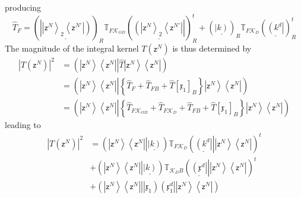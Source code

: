 \documentclass[aps,preprint]{revtex4}%
\begin{document}
producing
\begin{equation}
\hat{T}_{F}=\left(  \underline{\left\vert \left\vert \mathsf{z}^{N}%
\right\rangle _{2}\left\langle \mathsf{z}^{N\prime}\right\vert \right)
}\right)  _{R}\mathbb{T}_{F\mathcal{K}_{OD}}\left(  \underline{\left(
\left\vert \mathsf{z}^{N}\right\rangle _{2}\left\langle \mathsf{z}^{N\prime
}\right\vert \right\vert }\right)  _{R}^{t}+\left(  \underline{\left\vert
k\right)  }\right)  _{R}\mathbb{T}_{F\mathcal{K}_{D}}\left(  \underline
{\left(  k^{d}\right\vert }\right)  _{R}^{t}%
\end{equation}
The magnitude of the integral kernel $T\left(  \mathsf{z}^{N}\right)  $ is
thus determined by
\begin{align}
\left\vert T\left(  \mathsf{z}^{N}\right)  \right\vert ^{2}  &  =\left(
\left\vert \mathsf{z}^{N}\right\rangle \left\langle \mathsf{z}^{N}\right\vert
\left\vert \hat{T}\right.  \left\vert \mathsf{z}^{N}\right\rangle \left\langle
\mathsf{z}^{N}\right\vert \right) \nonumber\\
&  =\left(  \left\vert \mathsf{z}^{N}\right\rangle \left\langle \mathsf{z}%
^{N}\right\vert \left\vert \left\{  \hat{T}_{F}+\hat{T}_{FB}+\hat{T}\left[
\mathfrak{x}_{1}\right]  _{B}\right\}  \right.  \left\vert \mathsf{z}%
^{N}\right\rangle \left\langle \mathsf{z}^{N}\right\vert \right) \nonumber\\
&  =\left(  \left\vert \mathsf{z}^{N}\right\rangle \left\langle \mathsf{z}%
^{N}\right\vert \left\vert \left\{  \hat{T}_{F\mathcal{K}_{OD}}+\hat
{T}_{F\mathcal{K}_{D}}+\hat{T}_{FB}+\hat{T}\left[  \mathfrak{x}_{1}\right]
_{B}\right\}  \right.  \left\vert \mathsf{z}^{N}\right\rangle \left\langle
\mathsf{z}^{N}\right\vert \right)
\end{align}
leading to
\begin{align}
\left\vert T\left(  \mathsf{z}^{N}\right)  \right\vert ^{2}  &  =\left(
\left\vert \mathsf{z}^{N}\right\rangle \left\langle \mathsf{z}^{N}\right\vert
\left\vert \underline{\left\vert k\right)  }\right.  \right)  \mathbb{T}%
_{F\mathcal{K}_{D}}\left(  \left.  \underline{\left(  k^{d}\right\vert
}\right\vert \left\vert \mathsf{z}^{N}\right\rangle \left\langle
\mathsf{z}^{N}\right\vert \right)  ^{t}\nonumber\\
&  +\left(  \left\vert \mathsf{z}^{N}\right\rangle \left\langle \mathsf{z}%
^{N}\right\vert \left\vert \underline{\left\vert k\right)  }\right.  \right)
\mathbb{T}_{\mathcal{K}_{D}B}\left(  \left.  \underline{\left(  \mathfrak{x}%
^{d}\right\vert }\right\vert \left\vert \mathsf{z}^{N}\right\rangle
\left\langle \mathsf{z}^{N}\right\vert \right)  ^{t}\nonumber\\
&  +\left(  \left\vert \mathsf{z}^{N}\right\rangle \left\langle \mathsf{z}%
^{N}\right\vert \left\vert \left\vert \mathfrak{x}_{1}\right)  \left(
\mathfrak{x}_{1}^{d}\right\vert \right.  \left\vert \mathsf{z}^{N}%
\right\rangle \left\langle \mathsf{z}^{N}\right\vert \right)
\end{align}
\end{document}
